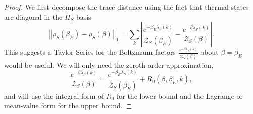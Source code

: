\documentclass{article}
\newcommand{\abs}[1]{\left| #1 \right|}
\newcommand{\norm}[1]{\left| \left| #1 \right| \right|}
\newcommand{\partfun}{\mathcal{Z}}
\begin{document}
\begin{proof}
    We first decompose the trace distance using the fact that thermal states are diagonal in the $H_S$ basis
    \begin{equation}
        \norm{\rho_S(\beta_E) - \rho_S(\beta)}_1 = \sum_k \abs{\frac{e^{-\beta_E \lambda_S(k)}}{\partfun_S(\beta_E)} - \frac{e^{-\beta \lambda_S(k)}}{\partfun_S(\beta)}}. \label{eq:thermal_diffs_1}
    \end{equation}
    This suggests a Taylor Series for the Boltzmann factors $\frac{e^{-\beta \lambda_S(k)}}{\partfun_S(\beta)}$ about $\beta = \beta_E$ would be useful. We will only need the zeroth order approximation,
    \begin{equation}
        \frac{e^{-\beta \lambda_S(k)}}{\partfun_S(\beta)} = \frac{e^{-\beta_E \lambda_S(k)}}{\partfun_S(\beta_E)} + R_0(\beta, \beta_E, k),
    \end{equation}
    and will use the integral form of $R_0$ for the lower bound and the Lagrange or mean-value form for the upper bound. 
    

\end{proof}
\end{document}
